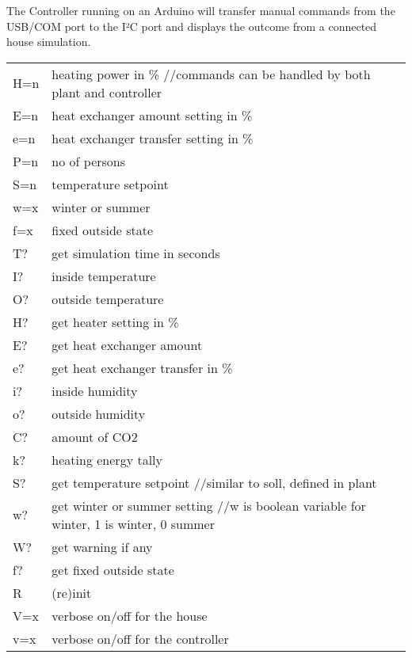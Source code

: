 The Controller running on an Arduino will transfer manual commands from the U\+S\+B/\+C\+OM port to the I²C port and displays the outcome from a connected house simulation.

\tabulinesep=1mm
\begin{longtabu}spread 0pt [c]{*{2}{|X[-1]}|}
\hline
H=n &heating power in \%  //commands can be handled by both plant and controller \\
E=n &heat exchanger amount setting in \%  \\
e=n &heat exchanger transfer setting in \%  \\
P=n &no of persons  \\
S=n &temperature setpoint  \\
w=x &winter or summer  \\
f=x &fixed outside state  \\
T? &get simulation time in seconds  \\
I? &inside temperature  \\
O? &outside temperature  \\
H? &get heater setting in \%  \\
E? &get heat exchanger amount  \\
e? &get heat exchanger transfer in \%  \\
i? &inside humidity  \\
o? &outside humidity  \\
C? &amount of C\+O2  \\
k? &heating energy tally  \\
S? &get temperature setpoint  //similar to soll, defined in plant \\
w? &get winter or summer setting  //w is boolean variable for winter, 1 is winter, 0 summer \\
W? &get warning if any  \\
f? &get fixed outside state  \\
R &(re)init  \\
V=x &verbose on/off for the house  \\
v=x &verbose on/off for the controller  \\
\end{longtabu}

